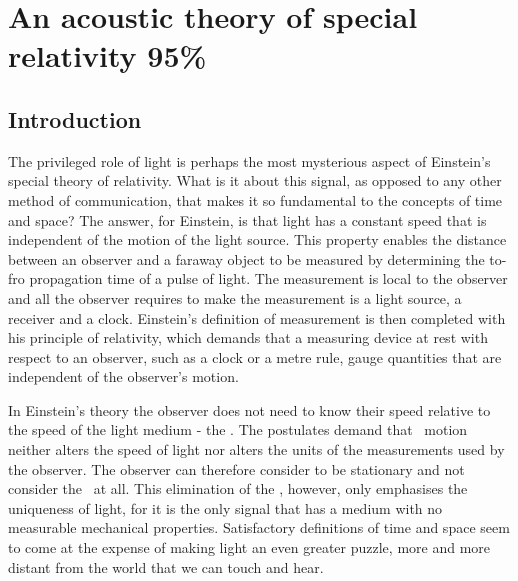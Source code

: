 

\chapter{An acoustic theory of special relativity 95\%}\label{ch:acousticSR}


\section{Introduction}\label{sec:AcousticSR:introduction}

The privileged role of light is perhaps the most mysterious aspect of Einstein's special theory of relativity.
What is it about this signal, as opposed to any other method of communication, that makes it  so fundamental to the  concepts of time and space?
The answer, for Einstein, is  that light has a constant speed that  is independent of the motion of the light source\cite{Einstein1905}.
This  property enables the  distance between an observer and a faraway object  to be measured  by determining the to-fro propagation time of a pulse of light.
The measurement is local to the observer and all the observer requires to make the measurement 
 is a light source, a receiver and a clock.
Einstein's definition of measurement is then completed with his principle of relativity,
which demands that a measuring device at rest with respect to an observer, such as a clock or a metre rule, 
gauge quantities that are independent of the observer's motion\cite{Einstein1905, Pierseaux2005}.

In Einstein's  theory the observer does  not need to know their speed relative to the speed of the light medium - the {\em \aether}.
The postulates demand that \aetherial\ motion  neither alters the speed of light
nor alters the units of the measurements used by the observer.
%
The observer can therefore consider \herself to be stationary and not consider the \aether\ at all.
This elimination of the \aether, however, only emphasises the uniqueness of light, for it is the  only  signal that has a  medium with no measurable mechanical properties.
Satisfactory definitions of time and space seem to come at the expense of making light  an even greater puzzle,
more and more distant from the world that we can touch and hear.

